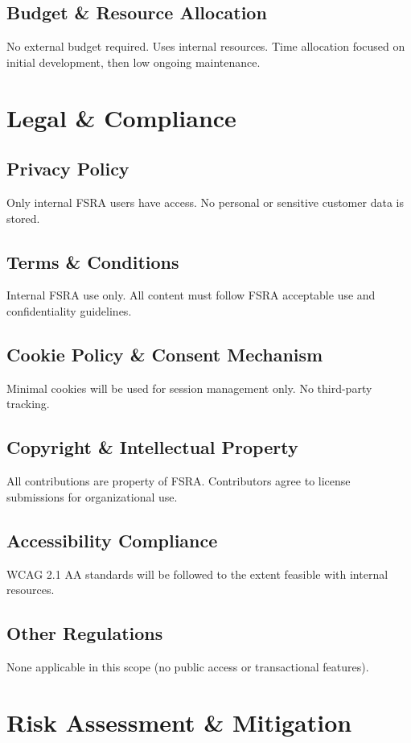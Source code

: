 \documentclass[11pt,a4paper]{article}
\begin{document}
\subsection{Budget \& Resource Allocation}
No external budget required. Uses internal resources. Time allocation focused on initial development, then low ongoing maintenance.

\section{Legal \& Compliance}

\subsection{Privacy Policy}
Only internal FSRA users have access. No personal or sensitive customer data is stored.

\subsection{Terms \& Conditions}
Internal FSRA use only. All content must follow FSRA acceptable use and confidentiality guidelines.

\subsection{Cookie Policy \& Consent Mechanism}
Minimal cookies will be used for session management only. No third-party tracking.

\subsection{Copyright \& Intellectual Property}
All contributions are property of FSRA. Contributors agree to license submissions for organizational use.

\subsection{Accessibility Compliance}
WCAG 2.1 AA standards will be followed to the extent feasible with internal resources.

\subsection{Other Regulations}
None applicable in this scope (no public access or transactional features).

\section{Risk Assessment \& Mitigation}
\end{document}
